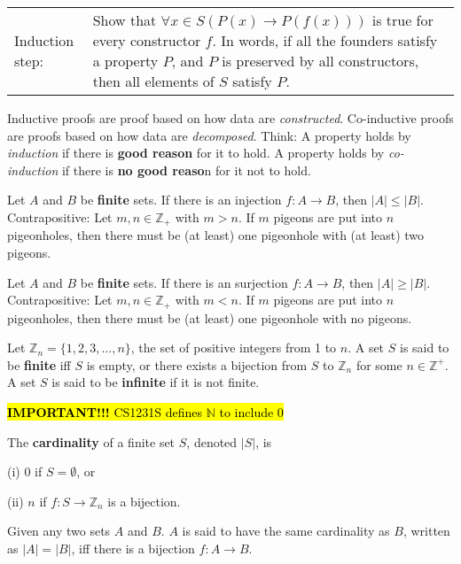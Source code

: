 \documentclass{article}
\begin{document}
\begin{description}
\begin{table}[h]
\begin{tabular}{lp{6in}}
			Induction step: & Show that $\forall x\in S(P(x)\to P(f(x)))$ is true for every constructor $f$. In words, if all the founders satisfy a property $P$, and $P$ is preserved by all constructors, then all elements of $S$ satisfy $P$. \\
		\end{tabular}
	\end{table}	     
	\endgroup
	\item[Induction vs Co-Induction] Inductive proofs are proof based on how data are \emph{constructed}. Co-inductive proofs are proofs based on how data are \emph{decomposed}. Think: A property holds by \emph{induction} if there is \textbf{good reason} for it to hold. A property holds by \emph{co-induction} if there is \textbf{no good reaso}n for it not to hold.
	
	\vspace{0.2cm}
    \item[\large Cardinality]
    \item[Pigeonhole Principle]Let $A$ and $B$ be \textbf{finite} sets. If there is an injection $f:A\to B$, then $|A| \leq |B|$. Contrapositive: Let $m, n\in\mathbb{Z}_{+}$ with $m > n$. If $m$ pigeons are put into $n$ pigeonholes, then there must be (at least) one pigeonhole with (at least) two pigeons.
    \item[Dual Pigeonhole Principles]Let $A$ and $B$ be \textbf{finite} sets. If there is an surjection $f:A\to B$, then $|A| \geq |B|$. Contrapositive: Let $m, n\in\mathbb{Z}_{+}$ with $m < n$. If $m$ pigeons are put into $n$ pigeonholes, then there must be (at least) one pigeonhole with no pigeons.
    \item[Finite set and Infinite set]Let $\mathbb{Z}_{n} = \{1,2,3,\dots,n\}$, the set of positive integers from 1 to $n$. A set $S$ is said to be \textbf{finite} iff $S$ is empty, or there exists a bijection from $S$ to $\mathbb{Z}_{n}$ for some $n\in\mathbb{Z}^{+}$. A set $S$ is said to be \textbf{infinite} if it is not finite.
    \item \qquad \hl{\textbf{IMPORTANT!!!} CS1231S defines $\mathbb{N}$ to include 0}
    \item[Cardinality]The \textbf{cardinality} of a finite set $S$, denoted $|S|$, is 
    \item \qquad \;(i) 0 if $S=\emptyset$, or 
    \item \qquad (ii) $n$ if $f:S\to \mathbb{Z}_{n}$ is a bijection.
    \item[Same Cardinality (Cantor)] Given any two sets $A$ and $B$. $A$ is said to have the same cardinality as $B$, written as $|A| = |B|$, iff there is a bijection $f:A\to B$.

\end{description}
\end{document}
